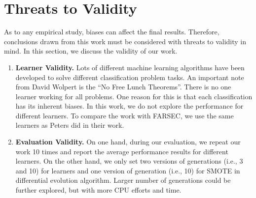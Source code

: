 \section{Threats to Validity}
\label{threats}

As to any empirical study, biases can affect the final results. Therefore, conclusions drawn from this work must be considered with threats to validity in mind. In this section, we discuss the validity of our work.

\begin{enumerate}
    \item \textbf{Learner Validity.} Lots of different machine learning algorithms have been developed to solve different classification problem tasks. An important note from David Wolpert is the ``No Free Lunch Theorems''. There is no one learner working for all problems. One reason for this is that each classification has its inherent biases. In this work, we do not explore the performance for different learners. To compare the work with FARSEC, we use the same learners as Peters did in their work.
    \item \textbf{Evaluation Validity.} On one hand, during our evaluation, we repeat our work 10 times and report the average performance results for different learners. On the other hand, we only set two versions of generations (i.e., 3 and 10) for learners and one version of generation (i.e., 10) for SMOTE in differential evolution algorithm. Larger number of generations could be further explored, but with more CPU efforts and time.
\end{enumerate}
